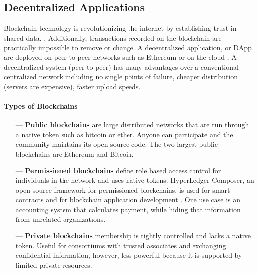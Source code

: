 \subsection{Decentralized Applications}
	Blockchain technology is revolutionizing the internet by establishing trust in shared data. \cite{book:bchainForDummies}.
	Additionally, transactions recorded on the blockchain are practically impossible to remove or change. 
	A decentralized application, or DApp are deployed on peer to peer networks such as Ethereum or on the cloud \footnotemark. A decentralized system (peer to peer) has many advantages over a conventional centralized network including no single points of failure, cheaper distribution (servers are expensive), faster upload speeds. 
	
	\paragraph{Types of Blockchains}
	\begin{itemize}
	\item[---]  \textbf{Public blockchains} are large distributed networks that are run through a native token such as bitcoin or ether. Anyone can participate and the community maintains its open-source code. The two largest public blockchains are Ethereum and Bitcoin.%
	\item[---] \textbf{Permissioned blockchains} define role based access control for individuals in the network and uses native tokens.  \gls{HyperLedger Composer}, an open-source framework for permissioned blockchains, is used for smart contracts and for blockchain application development \cite{hyperledgerComposer:Online}. One use case is an accounting system that calculates payment, while hiding that information from unrelated organizations.  %
	\item[---] \textbf{Private blockchains}  membership is tightly controlled and lacks a native token. Useful for consortiums with trusted associates and exchanging confidential information, however, less powerful because it is supported by limited private resources.
	\end{itemize}
	\vspace*{-0.5cm}
	
